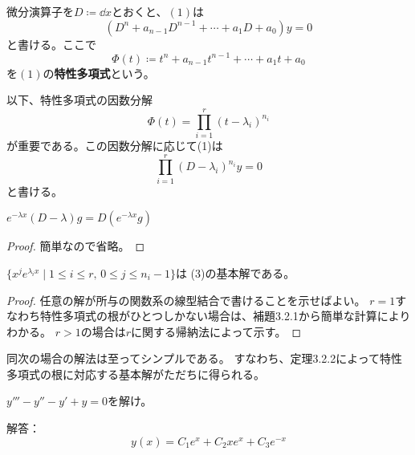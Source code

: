 \documentclass[report]{jlreq}
\begin{document}
\begin{definition}[特性多項式]
    微分演算子を$D \coloneqq \dd{x}$とおくと、$(1)$は
    \begin{equation}
        (D^n + a_{n-1} D^{n-1} + \cdots + a_1 D + a_0) y = 0
    \end{equation}
    と書ける。ここで
    \begin{equation}
        \Phi(t) \coloneqq t^n + a_{n-1} t^{n-1} + \cdots + a_1 t + a_0
    \end{equation}
    を$(1)$の\textbf{特性多項式}という。
\end{definition}

以下、特性多項式の因数分解
\begin{equation}
    \Phi(t) = \prod_{i=1}^r (t - \lambda_i)^{n_i}
\end{equation}
が重要である。この因数分解に応じて(1)は
\begin{equation}
    \prod_{i=1}^r (D - \lambda_i)^{n_i} y = 0 \tag{(3)}
\end{equation}
と書ける。

\begin{lemma}[3.2.1]
    $e^{-\lambda x} (D - \lambda) g = D (e^{-\lambda x} g)$
\end{lemma}

\begin{proof}
    簡単なので省略。
\end{proof}

\begin{theorem}[3.2.2]
    $\{ x^j e^{\lambda_i x} \mid 1 \le i \le r,\, 0 \le j \le n_i - 1 \}$は
    (3)の基本解である。
\end{theorem}

\begin{proof}
    任意の解が所与の関数系の線型結合で書けることを示せばよい。
    $r = 1$すなわち特性多項式の根がひとつしかない場合は、補題3.2.1から簡単な計算によりわかる。
    $r > 1$の場合は$r$に関する帰納法によって示す。
\end{proof}

同次の場合の解法は至ってシンプルである。
すなわち、定理3.2.2によって特性多項式の根に対応する基本解がただちに得られる。

\begin{problem}[3.2.4]
    $y''' - y'' - y' + y = 0$を解け。

    解答：
    \begin{equation}
        y(x) = C_1 e^x + C_2 x e^x + C_3 e^{-x}
    \end{equation}
\end{problem}
\end{document}
